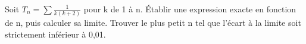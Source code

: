 \documentclass[11pt]{article}
\begin{document}
Soit \(T_{n}=\sum  \frac{1}{k(k+2)}\) pour k de 1 à n. Établir une expression exacte en fonction de n, puis calculer sa limite. Trouver le plus petit n tel que l’écart à la limite soit strictement inférieur à 0,01.\par
\vspace{5pt}
\end{document}
